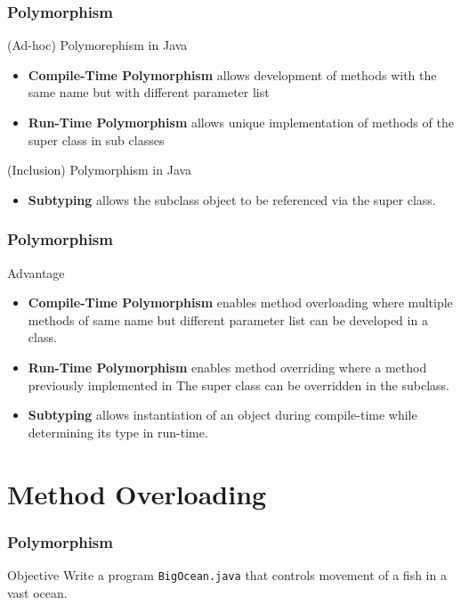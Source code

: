 \documentclass[10pt, compress]{beamer}
\begin{document}
\begin{frame}[fragile]
	\frametitle{Polymorphism}
	\begin{block}{(Ad-hoc) Polymorephism in Java}
		\begin{itemize}
			\item[] \textbf{Compile-Time Polymorphism} allows development of methods with the same name but with different parameter list
			\item[] \textbf{Run-Time Polymorphism} allows unique implementation of methods of the super class in sub classes
		\end{itemize}
	\end{block}
	\begin{block}{(Inclusion) Polymorphism in Java}
		\begin{itemize}
			\item[] \textbf{Subtyping} allows the subclass object to be referenced via the super class.
		\end{itemize}
	\end{block}
\end{frame}

\begin{frame}[fragile]
	\frametitle{Polymorphism}
	\begin{block}{Advantage}
		\begin{itemize}
			\item[] \textbf{Compile-Time Polymorphism} enables \alert{method overloading} where multiple methods of same name but different parameter list can be developed in a class.
			\item[] \textbf{Run-Time Polymorphism} enables \alert{method overriding} where a method previously implemented in The super class can be overridden in the subclass.
			\item[] \textbf{Subtyping} allows instantiation of an object during compile-time while determining its type in run-time.
		\end{itemize}
	\end{block}
\end{frame}

\section{Method Overloading}

\begin{frame}[fragile]
	\frametitle{Polymorphism}
	\begin{block}{Objective}
		Write a program \texttt{BigOcean.java} that controls movement of a fish in a vast ocean.
	\end{block}
\end{frame}
\end{document}
